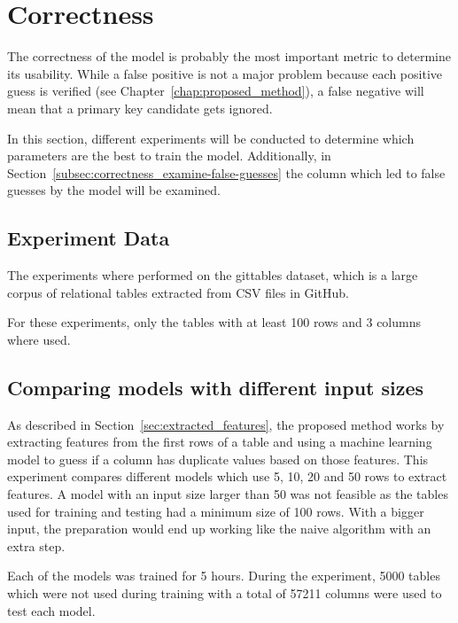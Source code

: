 \section{Correctness}\label{sec:correctness}
The correctness of the model is probably the most important metric to determine its usability. While a false positive is not a major problem because each positive guess is verified (see Chapter~\ref{chap:proposed_method}), a false negative will mean that a primary key candidate gets ignored.

In this section, different experiments will be conducted to determine which parameters are the best to train the model. Additionally, in Section~\ref{subsec:correctness_examine-false-guesses} the column which led to false guesses by the model will be examined.


\subsection{Experiment Data}\label{subsec:correctness_experiment-data} %
The experiments where performed on the gittables dataset, which is a large corpus of relational tables extracted from CSV files in GitHub\cite{gittables-article}.

For these experiments, only the tables with at least 100 rows and 3 columns where used. %


\subsection{Comparing models with different input sizes}\label{subsec:correctness_comparing-input-size} %
As described in Section~\ref{sec:extracted_features}, the proposed method works by extracting features from the first rows of a table and using a machine learning model to guess if a column has duplicate values based on those features. This experiment compares different models which use \num{5}, \num{10}, \num{20} and \num{50} rows to extract features. A model with an input size larger than \num{50} was not feasible as the tables used for training and testing had a minimum size of \num{100} rows. With a bigger input, the preparation would end up working like the naive algorithm with an extra step. %

Each of the models was trained for \num{5} hours. During the experiment, \num{5000} tables which were not used during training with a total of \num{57211} columns were used to test each model. %

